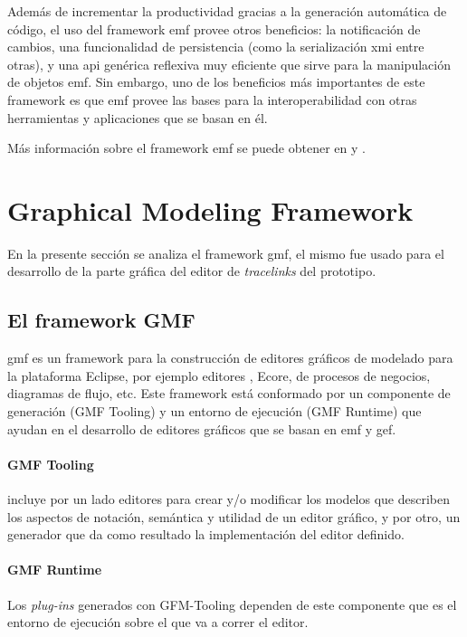 \documentclass[a4paper,12pt,twoside,spanish,openright]{book}
\begin{document}
Además de incrementar la productividad gracias a la generación automática de código, el uso del framework \gls{emf} provee otros beneficios: la notificación de cambios, una funcionalidad de persistencia (como la serialización \gls{xmi} entre otras), y una \gls{api} genérica reflexiva muy eficiente que sirve para la manipulación de objetos \gls{emf}. Sin embargo, uno de los beneficios más importantes de este framework es que \gls{emf} provee las bases para la interoperabilidad con otras herramientas y aplicaciones que se basan en él. 

Más información sobre el framework \gls{emf} se puede obtener en \cite{EMF} y \cite{EMFADG}.


\section{Graphical Modeling Framework}
\label{sec:GMF}

En la presente sección se analiza el framework \gls{gmf}, el mismo fue usado para el desarrollo de la parte gráfica del editor de \textit{tracelinks} del prototipo.

\subsection{El framework GMF}

\gls{gmf} es un framework para la construcción de editores gráficos de modelado para la plataforma \textsf{Eclipse}, por ejemplo editores , \textsf{Ecore}, de procesos de negocios, diagramas de flujo, etc. Este framework está conformado por un componente de generación (\textsf{GMF Tooling}) y un entorno de ejecución (\textsf{GMF Runtime}) que ayudan en el desarrollo de editores gráficos que se basan en \gls{emf} y \gls{gef}.

\paragraph{GMF Tooling} incluye por un lado editores para crear y/o modificar los modelos que describen los aspectos de notación, semántica y utilidad de un editor gráfico, y por otro, un generador que da como resultado la implementación del editor definido.

\paragraph{GMF Runtime} Los \textit{plug-ins} generados con \textsf{GFM-Tooling} dependen de este componente que es el entorno de ejecución sobre el que va a correr el editor.
\end{document}
